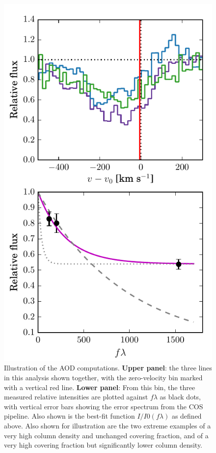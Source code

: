 \documentclass[twocolumn]{aastex61}
\begin{document}
\begin{figure}
\centering
\includegraphics[width=0.800\hsize]{../Figs/AOD-details-example.pdf}
\caption{Illustration of the AOD computations. \textbf{Upper panel}: the
three  lines in this analysis shown together, with the
zero-velocity bin marked with a vertical red line. \textbf{Lower panel}:
From this bin, the three measured relative intensities are plotted
against $f\lambda$ as black dots, with vertical error bars showing the
error spectrum from the COS pipeline. Also shown is the best-fit
function $I/I0 (f \lambda)$ as defined above. Also shown for
illustration are the two extreme examples of a very high column density
and unchanged covering fraction, and of a very high covering fraction
but significantly lower column density.}\label{fig:AOD}
\end{figure}
\end{document}
